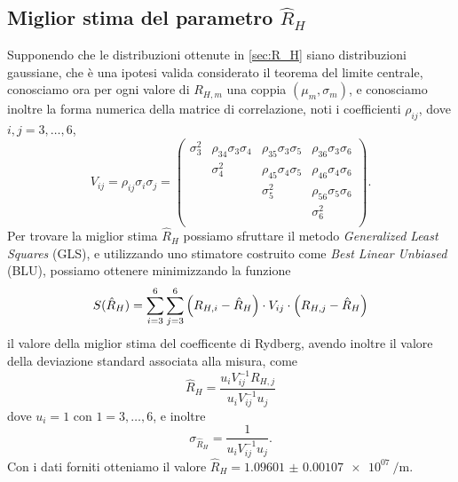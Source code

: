 \documentclass[a4paper,aps,12pt,tightenlines]{revtex4-2}
\begin{document}
\subsection{Miglior stima del parametro $\hat R_H$}
Supponendo che le distribuzioni ottenute in \autoref{sec:R_H} siano distribuzioni gaussiane, che è una ipotesi valida considerato il teorema del limite centrale, conosciamo ora per ogni valore di $R_{H,m}$ una coppia $(\mu_m, \sigma_m)$, e conosciamo inoltre la forma numerica della matrice di correlazione, noti i coefficienti $\rho_{ij}$, dove $i,j=3,\dots, 6$, \begin{equation}
V_{ij}=\rho_{ij}\sigma_i\sigma_j=\left(
\begin{matrix}
\sigma_3^2 & \rho_{34}\sigma_3\sigma_4 & \rho_{35}\sigma_3\sigma_5 & \rho_{36}\sigma_3\sigma_6 \\
& \sigma_4^2 & \rho_{45}\sigma_4\sigma_5 & \rho_{46}\sigma_4\sigma_6 \\
& & \sigma_5^2 & \rho_{56}\sigma_5\sigma_6 \\
& & & \sigma_6^2 \\
\end{matrix}
\right).
\end{equation} Per trovare la miglior stima $\hat R_H$ possiamo sfruttare il metodo \emph{Generalized Least Squares} (GLS), e utilizzando uno stimatore costruito come \emph{Best Linear Unbiased} (BLU), possiamo ottenere minimizzando la funzione \begin{equation} S(\hat R_H) = \sum_{i=3}^{6}\sum_{j = 3}^6 \qty(R_{H,i} - \hat R_H)\cdot V_{ij} \cdot \qty(R_{H,j} - \hat R_H) \end{equation} il valore della miglior stima del coefficente di Rydberg, avendo inoltre il valore della deviazione standard associata alla misura, come \begin{equation} \hat R_H = \frac{u_i V_{ij}^{-1} R_{H,j}}{u_i V_{ij}^{-1} u_j}\end{equation} dove $u_i = 1$  con $1=3, \dots, 6$, e inoltre \begin{equation} \sigma_{\hat R_H} = \frac{1}{u_i V_{ij}^{-1} u_j}.\end{equation} Con i dati forniti otteniamo il valore $\hat R_H = \SI{1.09601(107)e+07}{\per\meter}$.


\end{document}
